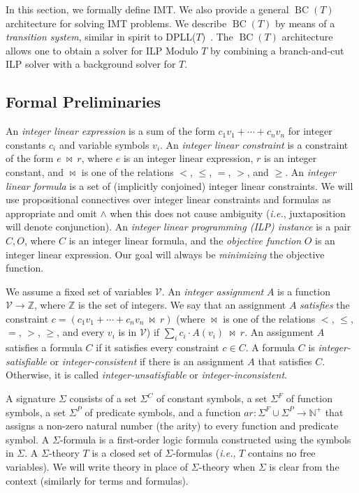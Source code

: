 \documentclass{llncs}
\newcommand{\comment}[1]{}
\newcommand{\ie}[0]{\emph{i.e.}, }
\newcommand{\bct}[0]{\ensuremath{\operatorname{BC}(T)}}
\newcommand{\dpllt}[0]{DPLL($T$)}
\begin{document}
In this section, we formally define IMT. We also provide a general
\bct{} architecture for solving IMT problems. We describe \bct{} by
means of a \emph{transition system}, similar in spirit to
\dpllt{}~\cite{dpllt}. The \bct{} architecture allows one to obtain a
solver for ILP Modulo $T$ by combining a branch-and-cut ILP solver
with a background solver for $T$.

\subsection{Formal Preliminaries}
\label{sec:def}

\comment{We assume a fixed set of variable symbols $\mathcal{V}$.}

An \emph{integer linear expression} is a sum of the form $c_1 v_1 +
\cdots + c_n v_n$ for integer constants $c_i$ and variable symbols
$v_i$. An \emph{integer linear constraint} is a constraint of the form
$e\ \bowtie\ r$, where $e$ is an integer linear expression, $r$ is an
integer constant, and $\bowtie$ is one of the relations $<$, $\leq$,
$=$, $>$, and $\geq$. An \emph{integer linear formula} is a set of
(implicitly conjoined) integer linear constraints. We will use
propositional connectives over integer linear constraints and formulas
as appropriate and omit $\wedge$ when this does not cause ambiguity
(\ie juxtaposition will denote conjunction). An \emph{integer linear
  programming (ILP) instance} is a pair $C, O$, where $C$ is an
integer linear formula, and the \emph{objective function} $O$ is an
integer linear expression. Our goal will always be \emph{minimizing}
the objective function.

We assume a fixed set of variables $\mathcal{V}$. An \emph{integer
  assignment} $A$ is a function $\mathcal{V} \rightarrow \mathbb{Z}$,
where $\mathbb{Z}$ is the set of integers. We say that an assignment
$A$ \emph{satisfies} the constraint $c = (c_1 v_1 + \cdots + c_n v_n\
\bowtie\ r)$ (where $\bowtie$ is one of the relations $<$, $\leq$,
$=$, $>$, $\geq$, and every $v_i$ is in $\mathcal{V}$) if $\sum_i c_i
\cdot A(v_i)\ \bowtie\ r$.  An assignment $A$ satisfies a formula $C$
if it satisfies every constraint $c \in C$.  A formula $C$ is
\emph{integer-satisfiable} or \emph{integer-consistent} if there is an
assignment $A$ that satisfies $C$. Otherwise, it is called
\emph{integer-unsatisfiable} or \emph{integer-inconsistent}.

A signature $\Sigma$ consists of a set $\Sigma^C$ of constant symbols,
a set $\Sigma^F$ of function symbols, a set $\Sigma^P$ of predicate
symbols, and a function $ar: \Sigma^F \cup \Sigma^P \rightarrow
\mathbb{N}^{+}$ that assigns a non-zero natural number (the arity) to
every function and predicate symbol. A $\Sigma$-formula is a
first-order logic formula constructed using the symbols in $\Sigma$.
A $\Sigma$-theory $T$ is a closed set of $\Sigma$-formulas (\ie $T$
contains no free variables). We will write theory in place of
$\Sigma$-theory when $\Sigma$ is clear from the context (similarly for
terms and formulas).
\end{document}
